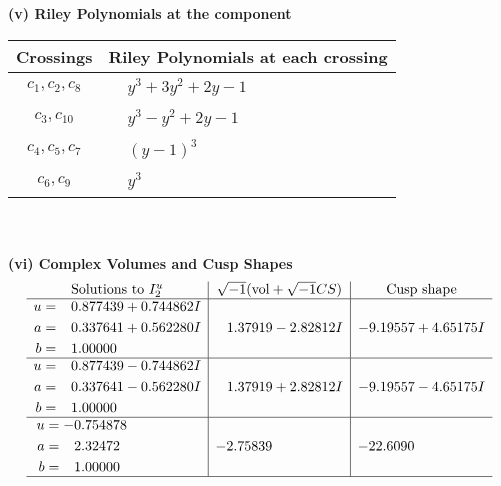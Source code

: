 \documentclass[1p]{elsarticle_modified}
\theoremstyle{definition}
\newcommand{\I}{\sqrt{-1}}
\begin{document}
\flushleft \textbf{(v) Riley Polynomials at the component}\newline \\
\begin{tabular}{m{50pt}|m{274pt}}
Crossings & \hspace{64pt}Riley Polynomials at each crossing \\
\hline $$\begin{aligned}c_{1},c_{2},c_{8}\end{aligned}$$&$\begin{aligned}
&y^3+3 y^2+2 y-1
\end{aligned}$\\
\hline $$\begin{aligned}c_{3},c_{10}\end{aligned}$$&$\begin{aligned}
&y^3- y^2+2 y-1
\end{aligned}$\\
\hline $$\begin{aligned}c_{4},c_{5},c_{7}\end{aligned}$$&$\begin{aligned}
&(y-1)^3
\end{aligned}$\\
\hline $$\begin{aligned}c_{6},c_{9}\end{aligned}$$&$\begin{aligned}
&y^3
\end{aligned}$\\
\hline
\end{tabular}\\~\\
\newpage\flushleft \textbf{(vi) Complex Volumes and Cusp Shapes}
$$\begin{array}{c|c|c}  
\text{Solutions to }I^u_{2}& \I (\text{vol} + \sqrt{-1}CS) & \text{Cusp shape}\\
 \hline 
\begin{aligned}
u &= \phantom{-}0.877439 + 0.744862 I \\
a &= \phantom{-}0.337641 + 0.562280 I \\
b &= \phantom{-}1.00000\phantom{ +0.000000I}\end{aligned}
 & \phantom{-}1.37919 - 2.82812 I & -9.19557 + 4.65175 I \\ \hline\begin{aligned}
u &= \phantom{-}0.877439 - 0.744862 I \\
a &= \phantom{-}0.337641 - 0.562280 I \\
b &= \phantom{-}1.00000\phantom{ +0.000000I}\end{aligned}
 & \phantom{-}1.37919 + 2.82812 I & -9.19557 - 4.65175 I \\ \hline\begin{aligned}
u &= -0.754878\phantom{ +0.000000I} \\
a &= \phantom{-}2.32472\phantom{ +0.000000I} \\
b &= \phantom{-}1.00000\phantom{ +0.000000I}\end{aligned}
 & -2.75839\phantom{ +0.000000I} & -22.6090\phantom{ +0.000000I}\\
 \hline 
 \end{array}$$\newpage
\end{document}
